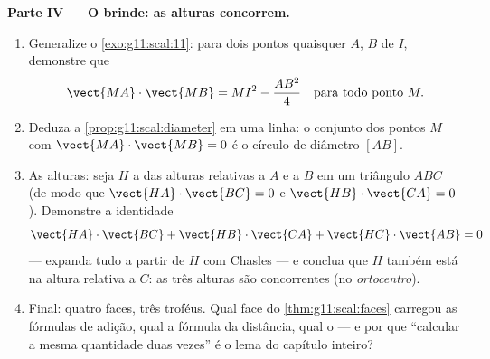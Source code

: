 \begin{problem}
\medskip
\noindent\textbf{Parte IV --- O brinde: as alturas concorrem.}
\begin{enumerate}[resume]
  \item Generalize o \cref{exo:g11:scal:11}: para dois pontos
        quaisquer $A$, $B$ de  $I$, demonstre que
        \[
        \vect{MA} \cdot \vect{MB} = MI^2 - \frac{AB^2}{4}
        \quad\text{para todo ponto } M .
        \]
  \item Deduza a \cref{prop:g11:scal:diameter} em uma linha: o
        conjunto dos pontos $M$ com
        $\vect{MA} \cdot \vect{MB} = 0$ é o círculo de diâmetro
        $[AB]$.
  \item As alturas: seja $H$ a  das alturas relativas a
        $A$ e a $B$ em um triângulo $ABC$ (de modo que
        $\vect{HA} \cdot \vect{BC} = 0$ e
        $\vect{HB} \cdot \vect{CA} = 0$). Demonstre a identidade
        \[
        \vect{HA} \cdot \vect{BC} + \vect{HB} \cdot \vect{CA}
        + \vect{HC} \cdot \vect{AB} = 0
        \]
        --- expanda tudo a partir de $H$ com Chasles --- e
        conclua que $H$ também está na altura relativa a $C$: as
        três alturas são concorrentes (no
        \emph{ortocentro}).
  \item Final: quatro faces, três troféus. Qual face do
        \cref{thm:g11:scal:faces} carregou as fórmulas de
        adição, qual a fórmula da distância, qual o 
        --- e por que ``calcular a mesma quantidade duas vezes''
        é o lema do capítulo inteiro?
\end{enumerate}
\end{problem}
